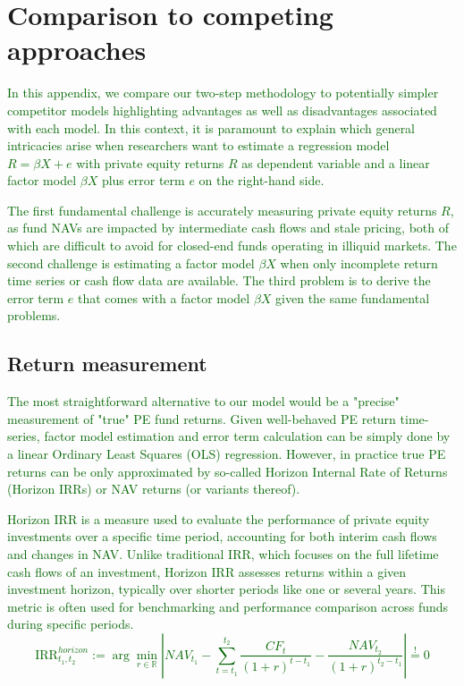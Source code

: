 \clearpage


\section{Comparison to competing approaches}
\label{sec:comparison}

\textcolor{darkgreen}{
	In this appendix, we compare our two-step methodology to potentially simpler competitor models highlighting advantages as well as disadvantages associated with each model.
	In this context, it is paramount to explain which general intricacies arise when researchers want to estimate a regression model $R = \beta X + e$ with private equity returns $R$ as dependent variable and a linear factor model $\beta X$ plus error term $e$ on the right-hand side.
}

\textcolor{darkgreen}{
	The first fundamental challenge is accurately measuring private equity returns $R$, as fund NAVs are impacted by intermediate cash flows and stale pricing, both of which are difficult to avoid for closed-end funds operating in illiquid markets. 
	The second challenge is estimating a factor model $\beta X$ when only incomplete return time series or cash flow data are available.
	The third problem is to derive the error term $e$ that comes with a factor model $\beta X$ given the same fundamental problems.
}

\subsection{Return measurement}

\textcolor{darkgreen}{
	The most straightforward alternative to our model would be a "precise" measurement of "true" PE fund returns.
	Given well-behaved PE return time-series, factor model estimation and error term calculation can be simply done by a linear Ordinary Least Squares (OLS) regression.
	However, in practice true PE returns can be only approximated by so-called Horizon Internal Rate of Returns (Horizon IRRs) or NAV returns (or variants thereof).
}

\textcolor{darkgreen}{
	Horizon IRR is a measure used to evaluate the performance of private equity investments over a specific time period, accounting for both interim cash flows and changes in NAV.
	Unlike traditional IRR, which focuses on the full lifetime cash flows of an investment, Horizon IRR assesses returns within a given investment horizon, typically over shorter periods like one or several years. 
	This metric is often used for benchmarking and performance comparison across funds during specific periods.
	\[
	\mathrm{IRR}_{t_1,t_2}^{horizon} := \arg \min_{r \in \mathbb{R}} 
	\left| 
	{NAV}_{t_1} -
	\sum_{t=t_1}^{t_2} \frac{{CF}_t}{(1 + r)^{t-t_1}} 
	- \frac{{NAV}_{t_2}}{(1 + r)^{t_2-t_1}}
	\right|
	\stackrel{!}{=} 0
	\]
}

